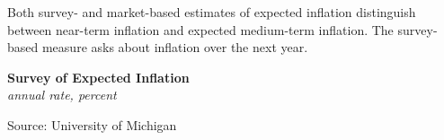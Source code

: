 \documentclass{report}
\makeatletter
\newcommand{\tbllink}[1]{\href{https://raw.githubusercontent.com/bdecon/US-chartbook/master/chartbook/data/#1}{\faTable}}
\newcommand*\short[1]{\expandafter\@gobbletwo\number\numexpr#1\relax}
\newcommand{\dateaxisticks}{
		date coordinates in=x, axis line style={draw=none},
		xmax={2022-10-31},
		max space between ticks=40,	    
		xtick={{1990-01-01}, {1992-01-01}, {1994-01-01}, 
			{1996-01-01}, {1998-01-01}, {2000-01-01}, 
			{2002-01-01}, {2004-01-01}, {2006-01-01},
			{2008-01-01}, {2010-01-01}, {2012-01-01}, {2014-01-01},
		    {2016-01-01}, {2018-01-01}, {2020-01-01}, {2022-01-01}, 
		    {2024-01-01}, {2026-01-01}},
		minor xtick={{1989-01-01}, {1991-01-01}, {1993-01-01},
			{1995-01-01}, {1997-01-01}, {1999-01-01}, 
			{2001-01-01}, {2003-01-01}, {2005-01-01}, {2007-01-01},
		    {2009-01-01}, {2011-01-01}, {2013-01-01}, {2015-01-01},
		    {2017-01-01}, {2019-01-01}, {2021-01-01}, {2023-01-01}, 
		    {2025-01-01}, {2027-01-01}},
		enlarge y limits={0.06}, enlarge x limits={0.01},
		}
\newcommand{\bbar}[2]{extra #1 ticks = {{#2}}, extra #1 tick labels = ,
		extra #1 tick style = {grid=major, grid style={thick, black!25}},}
\newcommand{\stdline}[4]{\addplot[very thick, no markers, color=#1] 
		table [x=#2, y=#3, col sep=comma] {#4};	}
\newcommand{\rbars}{
		\fill[color=black!10] (axis cs:{1990-07-01},\pgfkeysvalueof{/pgfplots/ymin}) rectangle 
			(axis cs:{1991-03-01}, \pgfkeysvalueof{/pgfplots/ymax});
		\fill[color=black!10] (axis cs:{2007-12-01},\pgfkeysvalueof{/pgfplots/ymin}) rectangle 
			(axis cs:{2009-07-01}, \pgfkeysvalueof{/pgfplots/ymax});
		\fill[color=black!10] (axis cs:{2001-03-01},\pgfkeysvalueof{/pgfplots/ymin}) rectangle 
			(axis cs:{2001-11-01}, \pgfkeysvalueof{/pgfplots/ymax});
		\fill[color=black!10] (axis cs:{2020-02-01},\pgfkeysvalueof{/pgfplots/ymin}) rectangle 
			(axis cs:{2020-05-01}, \pgfkeysvalueof{/pgfplots/ymax});}
\makeatother
\begin{document}
{\begin{minipage}{0.33\textwidth}

\end{minipage}
\vspace{1mm}

\begin{minipage}{0.76\textwidth}

\small Both survey- and market-based estimates of expected inflation distinguish between near-term inflation and expected medium-term inflation. The survey-based measure asks about inflation over the next year. 
\vspace{1mm}

\normalsize \textbf{Survey of Expected Inflation}\\
\footnotesize{\textit{annual rate, percent}}\\
\vspace{22mm}

\hspace{2mm} 
\vspace{1mm}

\footnotesize{Source: University of Michigan} \hfill \tbllink{infumichlt.csv}
\end{minipage}
\vspace{1mm}

}
\end{document}
